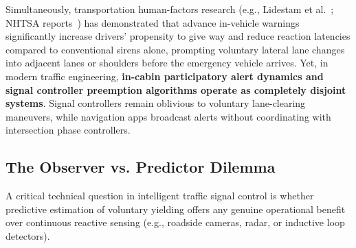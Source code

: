 \documentclass[journal,10pt,twocolumn]{IEEEtran}
\begin{document}
Simultaneously, transportation human-factors research (e.g., Lidestam et al.~\cite{lidestam2020}; NHTSA reports~\cite{nhtsa2009}) has demonstrated that advance in-vehicle warnings significantly increase drivers' propensity to give way and reduce reaction latencies compared to conventional sirens alone, prompting voluntary lateral lane changes into adjacent lanes or shoulders before the emergency vehicle arrives. Yet, in modern traffic engineering, \textbf{in-cabin participatory alert dynamics and signal controller preemption algorithms operate as completely disjoint systems}. Signal controllers remain oblivious to voluntary lane-clearing maneuvers, while navigation apps broadcast alerts without coordinating with intersection phase controllers.

\subsection{The Observer vs. Predictor Dilemma}
A critical technical question in intelligent traffic signal control is whether predictive estimation of voluntary yielding offers any genuine operational benefit over continuous reactive sensing (e.g., roadside cameras, radar, or inductive loop detectors).
\end{document}
